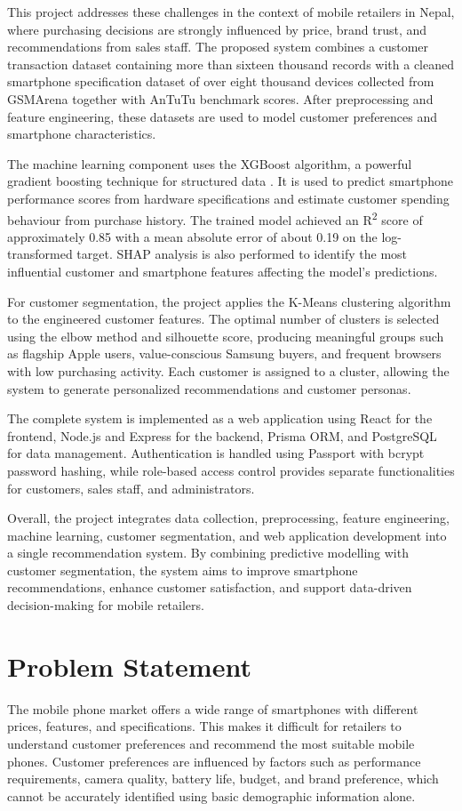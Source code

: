 \documentclass[12pt, a4paper]{report}
\numberwithin{figure}{chapter}
\numberwithin{table}{chapter}
\numberwithin{equation}{chapter}
\begin{document}
This project addresses these challenges in the context of mobile retailers in Nepal, where purchasing decisions are strongly
influenced by price, brand trust, and recommendations from sales staff. The proposed system combines a customer transaction dataset
containing more than sixteen thousand records with a cleaned smartphone specification dataset of over eight thousand devices collected
from GSMArena together with AnTuTu benchmark scores. After preprocessing and feature engineering, these datasets are used to model
customer preferences and smartphone characteristics.

The machine learning component uses the XGBoost algorithm, a powerful gradient boosting technique for structured data
\cite{chen}. It is used to predict smartphone performance scores from hardware specifications and estimate customer spending
behaviour from purchase history. The trained model achieved an R\textsuperscript{2} score of approximately 0.85 with a mean absolute
error of about 0.19 on the log-transformed target. SHAP analysis is also performed to identify the most influential customer and
smartphone features affecting the model's predictions.

For customer segmentation, the project applies the K-Means clustering algorithm to the engineered customer features. The optimal
number of clusters is selected using the elbow method and silhouette score, producing meaningful groups such as flagship Apple users,
value-conscious Samsung buyers, and frequent browsers with low purchasing activity. Each customer is assigned to a cluster, allowing
the system to generate personalized recommendations and customer personas.

The complete system is implemented as a web application using React for the frontend, Node.js and Express for the backend, Prisma
ORM, and PostgreSQL for data management. Authentication is handled using Passport with bcrypt password hashing, while role-based
access control provides separate functionalities for customers, sales staff, and administrators.

Overall, the project integrates data collection, preprocessing, feature engineering, machine learning, customer segmentation, and
web application development into a single recommendation system. By combining predictive modelling with customer segmentation, the
system aims to improve smartphone recommendations, enhance customer satisfaction, and support data-driven decision-making for mobile
retailers. 
\section{Problem Statement}
The mobile phone market offers a wide range of smartphones with different prices, features, and specifications. This makes it difficult for retailers to understand customer preferences and recommend the most suitable mobile phones. Customer preferences are influenced by factors such as performance requirements, camera quality, battery life, budget, and brand preference, which cannot be accurately identified using basic demographic information alone.
\end{document}
